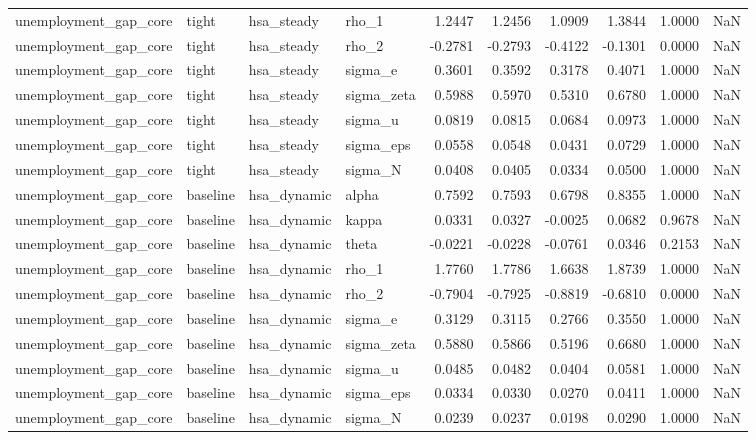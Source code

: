 \begin{tabular}{llllrrrrrl}
unemployment\_gap\_core & tight & hsa\_steady & rho\_1 & 1.2447 & 1.2456 & 1.0909 & 1.3844 & 1.0000 & NaN \\
unemployment\_gap\_core & tight & hsa\_steady & rho\_2 & -0.2781 & -0.2793 & -0.4122 & -0.1301 & 0.0000 & NaN \\
unemployment\_gap\_core & tight & hsa\_steady & sigma\_e & 0.3601 & 0.3592 & 0.3178 & 0.4071 & 1.0000 & NaN \\
unemployment\_gap\_core & tight & hsa\_steady & sigma\_zeta & 0.5988 & 0.5970 & 0.5310 & 0.6780 & 1.0000 & NaN \\
unemployment\_gap\_core & tight & hsa\_steady & sigma\_u & 0.0819 & 0.0815 & 0.0684 & 0.0973 & 1.0000 & NaN \\
unemployment\_gap\_core & tight & hsa\_steady & sigma\_eps & 0.0558 & 0.0548 & 0.0431 & 0.0729 & 1.0000 & NaN \\
unemployment\_gap\_core & tight & hsa\_steady & sigma\_N & 0.0408 & 0.0405 & 0.0334 & 0.0500 & 1.0000 & NaN \\
unemployment\_gap\_core & baseline & hsa\_dynamic & alpha & 0.7592 & 0.7593 & 0.6798 & 0.8355 & 1.0000 & NaN \\
unemployment\_gap\_core & baseline & hsa\_dynamic & kappa & 0.0331 & 0.0327 & -0.0025 & 0.0682 & 0.9678 & NaN \\
unemployment\_gap\_core & baseline & hsa\_dynamic & theta & -0.0221 & -0.0228 & -0.0761 & 0.0346 & 0.2153 & NaN \\
unemployment\_gap\_core & baseline & hsa\_dynamic & rho\_1 & 1.7760 & 1.7786 & 1.6638 & 1.8739 & 1.0000 & NaN \\
unemployment\_gap\_core & baseline & hsa\_dynamic & rho\_2 & -0.7904 & -0.7925 & -0.8819 & -0.6810 & 0.0000 & NaN \\
unemployment\_gap\_core & baseline & hsa\_dynamic & sigma\_e & 0.3129 & 0.3115 & 0.2766 & 0.3550 & 1.0000 & NaN \\
unemployment\_gap\_core & baseline & hsa\_dynamic & sigma\_zeta & 0.5880 & 0.5866 & 0.5196 & 0.6680 & 1.0000 & NaN \\
unemployment\_gap\_core & baseline & hsa\_dynamic & sigma\_u & 0.0485 & 0.0482 & 0.0404 & 0.0581 & 1.0000 & NaN \\
unemployment\_gap\_core & baseline & hsa\_dynamic & sigma\_eps & 0.0334 & 0.0330 & 0.0270 & 0.0411 & 1.0000 & NaN \\
unemployment\_gap\_core & baseline & hsa\_dynamic & sigma\_N & 0.0239 & 0.0237 & 0.0198 & 0.0290 & 1.0000 & NaN \\

\end{tabular}

